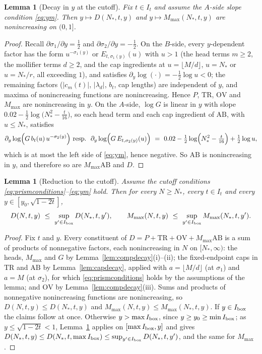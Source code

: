 \documentclass[11pt]{article}
\newtheorem{lemma}[theorem]{Lemma}
\theoremstyle{definition}
\begin{document}
\begin{lemma}[Decay in $y$ at the cutoff]\label{lem:ydecay}
Fix $t\in I_t$ and assume the $A$-side slope condition
\eqref{eq:ym}. Then $y\mapsto D(N_*,t,y)$ and
$y\mapsto M_{\max}(N_*,t,y)$ are nonincreasing on $(0,1]$.
\end{lemma}

\begin{proof}
Recall $\partial\sigma_1/\partial y=\frac12$ and
$\partial\sigma_2/\partial y=-\frac12$. On the $B$-side, every
$y$-dependent factor has the form $u^{-\sigma_1(y)}$ or
$E_{t,\sigma_1(y)}(u)$ with $u>1$ (the head terms $m\ge2$, the
mollifier terms $d\ge2$, and the cap ingredients at
$u=\lfloor M/d\rfloor$, $u=N_*$ or $u=N_*/r$, all exceeding $1$),
and satisfies $\partial_y\log(\cdot)=-\frac12\log u<0$; the
remaining factors ($|c_m(t)|$, $|\lambda_d|$, $b_t$, cap lengths)
are independent of $y$, and maxima of nonincreasing functions are
nonincreasing. Hence $P$, $\mathrm{TR}$, $\mathrm{OV}$ and
$M_{\max}$ are nonincreasing in $y$. On the $A$-side, $\log G$ is
linear in $y$ with slope
$0.02-\frac12\log\bigl(N_*^2-\frac t{16}\bigr)$, so each head
term and each cap ingredient of $\mathrm{AB}$, with $u\le N_*$,
satisfies
\[
\partial_y\log\Bigl(G\,b_t(u)\,u^{-\sigma_2(y)}\Bigr)
\ \text{resp.}\ \
\partial_y\log\Bigl(G\,E_{t,\sigma_2(y)}(u)\Bigr)
\ =\ 0.02-\tfrac12\log\Bigl(N_*^2-\tfrac t{16}\Bigr)
+\tfrac12\log u,
\]
which is at most the left side of \eqref{eq:ym}, hence negative.
So $\mathrm{AB}$ is nonincreasing in $y$, and therefore so are
$M_{\max}\mathrm{AB}$ and $D$.
\end{proof}

\begin{lemma}[Reduction to the cutoff]\label{lem:reduction}
Assume the cutoff conditions \eqref{eq:prismconditions}--\eqref{eq:ym} hold.
Then for every $N\ge N_*$, every $t\in I_t$ and every
$y\in[y_0,\sqrt{1-2t}]$,
\[
D(N,t,y)\ \le\ \sup_{y'\in I_{\rm box}}D(N_*,t,y'),
\qquad
M_{\max}(N,t,y)\ \le\ \sup_{y'\in I_{\rm box}}M_{\max}(N_*,t,y').
\]
\end{lemma}

\begin{proof}
Fix $t$ and $y$. Every constituent of
$D=P+\mathrm{TR}+\mathrm{OV}+M_{\max}\mathrm{AB}$ is a sum of
products of nonnegative factors, each nonincreasing in $N$ on
$[N_*,\infty)$: the heads, $M_{\max}$ and $G$ by
Lemma~\ref{lem:compdecay}(i)--(ii); the fixed-endpoint caps in
$\mathrm{TR}$ and $\mathrm{AB}$ by Lemma~\ref{lem:capdecay},
applied with $a=\lfloor M/d\rfloor$ (at $\sigma_1$) and $a=M$ (at
$\sigma_2$), for which \eqref{eq:prismconditions} holds by the assumptions
of the lemma;
and $\mathrm{OV}$ by Lemma~\ref{lem:compdecay}(iii). Sums and
products of nonnegative nonincreasing functions are nonincreasing,
so $D(N,t,y)\le D(N_*,t,y)$ and
$M_{\max}(N,t,y)\le M_{\max}(N_*,t,y)$. If $y\in I_{\rm box}$
the claims follow at once. Otherwise $y>\max I_{\rm box}$, since
$y\ge y_0\ge\min I_{\rm box}$; as $y\le\sqrt{1-2t}<1$,
Lemma~\ref{lem:ydecay} applies on $[\max I_{\rm box},y]$ and
gives $D(N_*,t,y)\le D(N_*,t,\max I_{\rm box})
\le\sup_{y'\in I_{\rm box}}D(N_*,t,y')$, and the same for
$M_{\max}$.
\end{proof}
\end{document}
